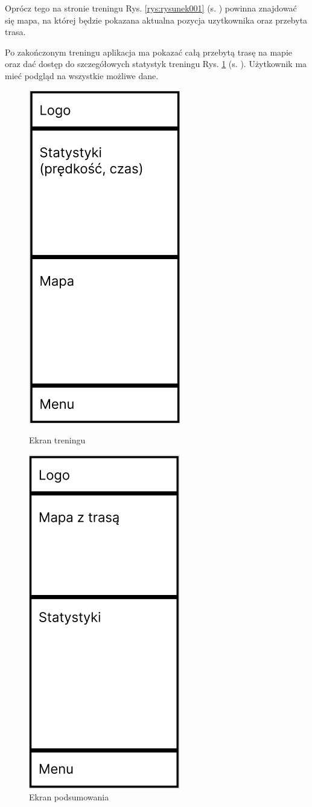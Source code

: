 Oprócz tego na stronie treningu Rys. \ref{rys:rysunek001} (s. \pageref{rys:rysunek001}) powinna znajdować się mapa, na której będzie pokazana aktualna pozycja uzytkownika oraz przebyta trasa.

Po zakończonym treningu aplikacja ma pokazać całą przebytą trasę na mapie oraz dać dostęp do szczegółowych statystyk treningu Rys. \ref{rys:rysunek002} (s. \pageref{rys:rysunek002}). Użytkownik ma mieć podgląd na wszystkie możliwe dane.

\begin{figure}[!htb]
	\centering
	\begin{minipage}{.5\textwidth}
		\centering
		\includegraphics[width=.4\linewidth]{rys/ekran_treningu.png}
		\caption{Ekran treningu}
		\label{rys:rysunek001}
	\end{minipage}%
	\begin{minipage}{.5\textwidth}
		\centering
		\includegraphics[width=.4\linewidth]{rys/ekran_podsumowania.png}
		\caption{Ekran podsumowania}
		\label{rys:rysunek002}
	\end{minipage}
\end{figure}

